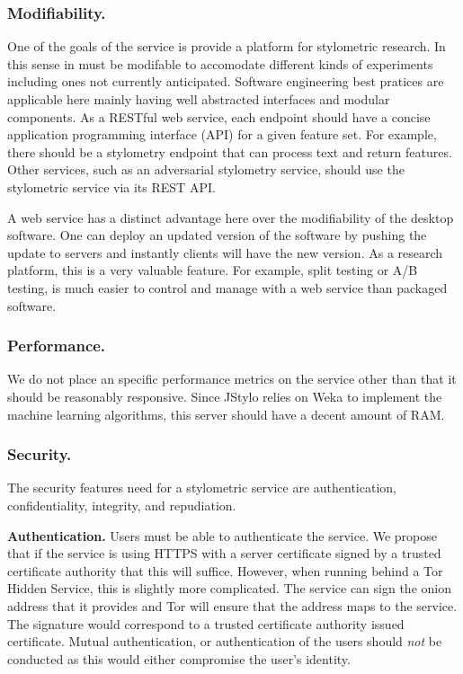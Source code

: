 \documentclass[letterpaper]{article}
\begin{document}
\subsubsection{Modifiability.}

One of the goals of the service is provide a platform for stylometric
research.  In this sense in must be modifable to accomodate different
kinds of experiments including ones not currently anticipated.
Software engineering best pratices are applicable here mainly having
well abstracted interfaces and modular components.  As a RESTful web
service, each endpoint should have a concise application programming
interface (API) for a given feature set.  For example, there should be
a stylometry endpoint that can process text and return features.
Other services, such as an adversarial stylometry service, should use
the stylometric service via its REST API.

A web service has a distinct advantage here over the modifiability of
the desktop software.  One can deploy an updated version of the
software by pushing the update to servers and instantly clients will
have the new version.  As a research platform, this is a very valuable
feature.  For example, split testing or A/B testing, is much easier to
control and manage with a web service than packaged software.

\subsubsection{Performance.}

We do not place an specific performance metrics on the service other
than that it should be reasonably responsive.  Since JStylo relies on
Weka \cite{Hall:2009:WDM:1656274.1656278} to implement the machine
learning algorithms, this server should have a decent amount of RAM.

\subsubsection{Security.}

The security features need for a stylometric service are
authentication, confidentiality, integrity, and repudiation.

{\bf Authentication.}  Users must be able to authenticate the
service.  We propose that if the service is using HTTPS with a server
certificate signed by a trusted certificate authority that this will
suffice.  However, when running behind a Tor Hidden Service, this is
slightly more complicated.  The service can sign the onion address
that it provides and Tor will ensure that the address maps to the
service.  The signature would correspond to a trusted certificate
authority issued certificate.  Mutual authentication, or
authentication of the users should \emph{not} be conducted as this
would either compromise the user's identity.
\end{document}
